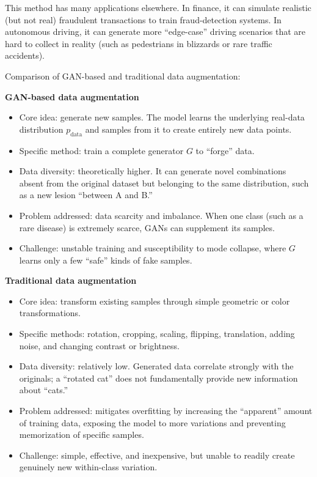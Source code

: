 This method has many applications elsewhere. In finance, it can simulate realistic (but not real) fraudulent transactions to train fraud-detection systems. In autonomous driving, it can generate more ``edge-case'' driving scenarios that are hard to collect in reality (such as pedestrians in blizzards or rare traffic accidents).

Comparison of GAN-based and traditional data augmentation:

\textbf{GAN-based data augmentation}

\begin{itemize}
\tightlist
\item
  Core idea: generate new samples. The model learns the underlying real-data distribution \(p_{\mathrm{data}}\) and samples from it to create entirely new data points.
\item
  Specific method: train a complete generator \(G\) to ``forge'' data.
\item
  Data diversity: theoretically higher. It can generate novel combinations absent from the original dataset but belonging to the same distribution, such as a new lesion ``between A and B.''
\item
  Problem addressed: data scarcity and imbalance. When one class (such as a rare disease) is extremely scarce, GANs can supplement its samples.
\item
  Challenge: unstable training and susceptibility to mode collapse, where \(G\) learns only a few ``safe'' kinds of fake samples.
\end{itemize}

\textbf{Traditional data augmentation}

\begin{itemize}
\tightlist
\item
  Core idea: transform existing samples through simple geometric or color transformations.
\item
  Specific methods: rotation, cropping, scaling, flipping, translation, adding noise, and changing contrast or brightness.
\item
  Data diversity: relatively low. Generated data correlate strongly with the originals; a ``rotated cat'' does not fundamentally provide new information about ``cats.''
\item
  Problem addressed: mitigates overfitting by increasing the ``apparent'' amount of training data, exposing the model to more variations and preventing memorization of specific samples.
\item
  Challenge: simple, effective, and inexpensive, but unable to readily create genuinely new within-class variation.
\end{itemize}

